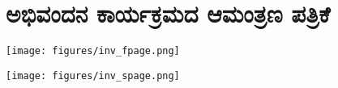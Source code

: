 {\fontsize{14}{16}\selectfont
\chapter{ಅಭಿವಂದನ ಕಾರ್ಯಕ್ರಮದ ಆಮಂತ್ರಣ ಪತ್ರಿಕೆ}

\centerline{\texttt{[image: figures/inv\_fpage.png]}}
\medskip

\centerline{\texttt{[image: figures/inv\_spage.png]}}
}

